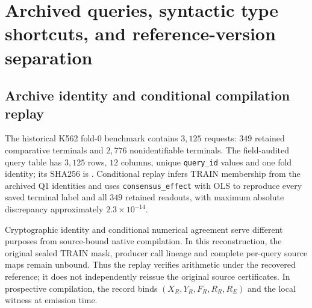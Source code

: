 \par
\section{Archived queries, syntactic type shortcuts, and reference-version separation}
\label{supp:native}
\subsection{Archive identity and conditional compilation replay}
The historical K562 fold-0 benchmark contains $3{,}125$ requests: $349$ retained comparative terminals and $2{,}776$ nonidentifiable terminals. The field-audited query table has $3{,}125$ rows, $12$ columns, unique \texttt{query\_id} values and one fold identity; its SHA256 is \texttt{}. Conditional replay infers TRAIN membership from the archived Q1 identities and uses \texttt{consensus\_effect} with OLS to reproduce every saved terminal label and all $349$ retained readouts, with maximum absolute discrepancy approximately $2.3\times10^{-14}$.

Cryptographic identity and conditional numerical agreement serve different purposes from source-bound native compilation. In this reconstruction, the original sealed TRAIN mask, producer call lineage and complete per-query source maps remain unbound. Thus the replay verifies arithmetic under the recovered reference; it does not independently reissue the original source certificates. In prospective compilation, the record binds $(X_R,Y_R,F_R,R_R,R_E)$ and the local witness at emission time.

